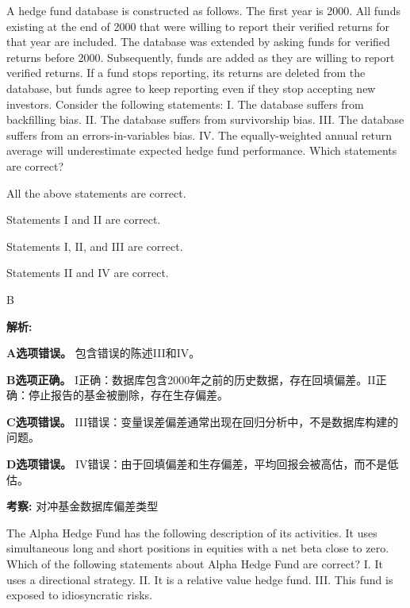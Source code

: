 \documentclass{article}
\newcounter{question} %
\newenvironment{explanation}
{\textbf{解析:}\par}
{\par}
\newcommand{\checklist}[1]{
    \textbf{考察:} #1 \par %
    \addcontentsline{toc}{subsection}{题号\thequestion 考察: #1} %
    \vspace{2em} %
}
\begin{document}
\begin{question}
    A hedge fund database is constructed as follows. The first year is 2000. All funds existing at the end of 2000 that were willing to report their verified returns for that year are included. The database was extended by asking funds for verified returns before 2000. Subsequently, funds are added as they are willing to report verified returns. If a fund stops reporting, its returns are deleted from the database, but funds agree to keep reporting even if they stop accepting new investors. Consider the following statements:  
    I. The database suffers from backfilling bias.  
    II. The database suffers from survivorship bias.  
    III. The database suffers from an errors-in-variables bias.  
    IV. The equally-weighted annual return average will underestimate expected hedge fund performance.  
    Which statements are correct?
\end{question}

\begin{choices}
    \item All the above statements are correct.
    \item Statements I and II are correct.
    \item Statements I, II, and III are correct.
    \item Statements II and IV are correct.
\end{choices}

\begin{correctanswer}
    B
\end{correctanswer}

\begin{explanation}
    \textbf{A选项错误。}  
    包含错误的陈述III和IV。

    \textbf{B选项正确。}  
    I正确：数据库包含2000年之前的历史数据，存在回填偏差。II正确：停止报告的基金被删除，存在生存偏差。

    \textbf{C选项错误。}  
    III错误：变量误差偏差通常出现在回归分析中，不是数据库构建的问题。

    \textbf{D选项错误。}  
    IV错误：由于回填偏差和生存偏差，平均回报会被高估，而不是低估。
\end{explanation}
\checklist{对冲基金数据库偏差类型}


\begin{question}
    The Alpha Hedge Fund has the following description of its activities. It uses simultaneous long and short positions in equities with a net beta close to zero. Which of the following statements about Alpha Hedge Fund are correct?  
    I. It uses a directional strategy.  
    II. It is a relative value hedge fund.  
    III. This fund is exposed to idiosyncratic risks.
\end{question}
\end{document}
